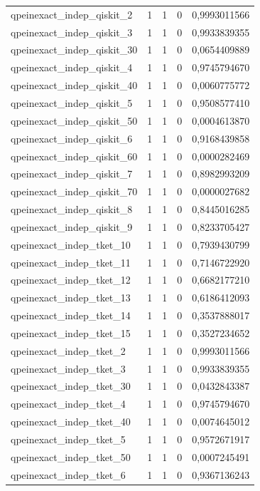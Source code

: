\begin{longtable}{lrrrr}
qpeinexact\_indep\_qiskit\_2 & 1 & 1 & 0 & 0,9993011566 \\
qpeinexact\_indep\_qiskit\_3 & 1 & 1 & 0 & 0,9933839355 \\
qpeinexact\_indep\_qiskit\_30 & 1 & 1 & 0 & 0,0654409889 \\
qpeinexact\_indep\_qiskit\_4 & 1 & 1 & 0 & 0,9745794670 \\
qpeinexact\_indep\_qiskit\_40 & 1 & 1 & 0 & 0,0060775772 \\
qpeinexact\_indep\_qiskit\_5 & 1 & 1 & 0 & 0,9508577410 \\
qpeinexact\_indep\_qiskit\_50 & 1 & 1 & 0 & 0,0004613870 \\
qpeinexact\_indep\_qiskit\_6 & 1 & 1 & 0 & 0,9168439858 \\
qpeinexact\_indep\_qiskit\_60 & 1 & 1 & 0 & 0,0000282469 \\
qpeinexact\_indep\_qiskit\_7 & 1 & 1 & 0 & 0,8982993209 \\
qpeinexact\_indep\_qiskit\_70 & 1 & 1 & 0 & 0,0000027682 \\
qpeinexact\_indep\_qiskit\_8 & 1 & 1 & 0 & 0,8445016285 \\
qpeinexact\_indep\_qiskit\_9 & 1 & 1 & 0 & 0,8233705427 \\
qpeinexact\_indep\_tket\_10 & 1 & 1 & 0 & 0,7939430799 \\
qpeinexact\_indep\_tket\_11 & 1 & 1 & 0 & 0,7146722920 \\
qpeinexact\_indep\_tket\_12 & 1 & 1 & 0 & 0,6682177210 \\
qpeinexact\_indep\_tket\_13 & 1 & 1 & 0 & 0,6186412093 \\
qpeinexact\_indep\_tket\_14 & 1 & 1 & 0 & 0,3537888017 \\
qpeinexact\_indep\_tket\_15 & 1 & 1 & 0 & 0,3527234652 \\
qpeinexact\_indep\_tket\_2 & 1 & 1 & 0 & 0,9993011566 \\
qpeinexact\_indep\_tket\_3 & 1 & 1 & 0 & 0,9933839355 \\
qpeinexact\_indep\_tket\_30 & 1 & 1 & 0 & 0,0432843387 \\
qpeinexact\_indep\_tket\_4 & 1 & 1 & 0 & 0,9745794670 \\
qpeinexact\_indep\_tket\_40 & 1 & 1 & 0 & 0,0074645012 \\
qpeinexact\_indep\_tket\_5 & 1 & 1 & 0 & 0,9572671917 \\
qpeinexact\_indep\_tket\_50 & 1 & 1 & 0 & 0,0007245491 \\
qpeinexact\_indep\_tket\_6 & 1 & 1 & 0 & 0,9367136243 \\

\end{longtable}
